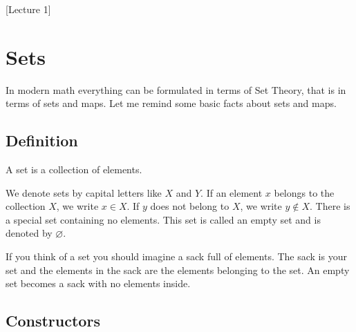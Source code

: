 [Lecture 1]


\newpage

\section{Sets}

In modern math everything can be formulated in terms of Set Theory, that is in terms of sets and maps.
Let me remind some basic facts about sets and maps.

\subsection{Definition}

\begin{definition}
A set is a collection of elements.
\end{definition}

We denote sets by capital letters like $X$ and $Y$.
If an element $x$ belongs to the collection $X$, we write $x\in X$.
If $y$ does not belong to $X$, we write $y\notin X$.
There is a special set containing no elements.
This set is called an empty set and is denoted by $\varnothing$.

If you think of a set you should imagine a sack full of elements.
The sack is your set and the elements in the sack are the elements belonging to the set.
An empty set becomes a sack with no elements inside.

\subsection{Constructors}


